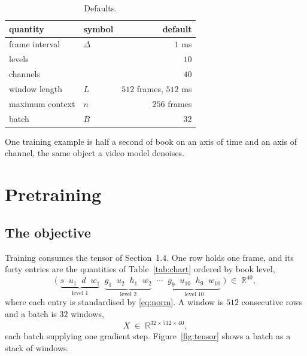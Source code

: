 \documentclass[10pt,a4paper]{article}
\begin{document}
\begin{table}[H]
\centering\small
\begin{tabular}{llr}
\toprule
quantity & symbol & default \\
\midrule
frame interval   & $\Delta$ & $1$ ms \\
levels           &          & $10$ \\
channels         &          & $40$ \\
window length    & $L$      & $512$ frames, $512$ ms \\
maximum context  & $n$      & $256$ frames \\
batch            & $B$      & $32$ \\
\bottomrule
\end{tabular}
\caption{Defaults.}
\label{tab:defaults}
\end{table}

One training example is half a second of book on an axis of time and an axis
of channel, the same object a video model denoises.


\clearpage
\section{Pretraining}

\subsection{The objective}

Training consumes the tensor of Section~1.4. One row holds one frame, and its
forty entries are the quantities of Table~\ref{tab:chart} ordered by book level,
%
\begin{equation}
\bigl(\;
\underbrace{s \;\; u_1 \;\; d \;\; w_1}_{\text{level }1}
\;\;
\underbrace{g_1 \;\; u_2 \;\; h_1 \;\; w_2}_{\text{level }2}
\;\;\cdots\;\;
\underbrace{g_9 \;\; u_{10} \;\; h_9 \;\; w_{10}}_{\text{level }10}
\;\bigr) \;\in\; \mathbb{R}^{40},
\label{eq:row}
\end{equation}
%
where each entry is standardised by \eqref{eq:norm}. A window is $512$
consecutive rows and a batch is $32$ windows,
%
\begin{equation}
X \;\in\; \mathbb{R}^{32\times 512\times 40},
\label{eq:data}
\end{equation}
%
each batch supplying one gradient step. Figure~\ref{fig:tensor} shows a batch as
a stack of windows.
\end{document}
